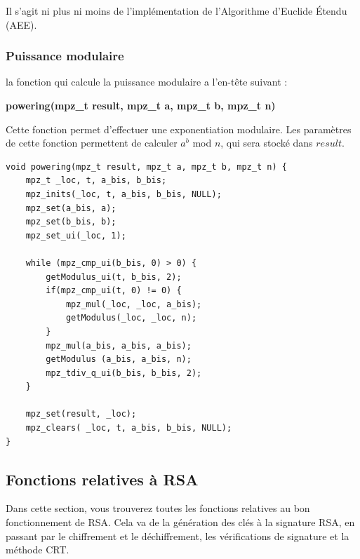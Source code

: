 \documentclass[12pt]{article}
\theoremstyle{definition}\newtheorem{defn}{Définition}
\theoremstyle{definition}\newtheorem{exm}{Exemple}
\theoremstyle{definition}\newtheorem{rem}{Remarque}
\theoremstyle{definition}\newtheorem{algo}{Algorithme}
\theoremstyle{remark}\newtheorem{exo}{Exercice}
\theoremstyle{remark}\newtheorem{nota}{Notation}
\begin{document}
Il s'agit ni plus ni moins de l'implémentation de l'Algorithme d'Euclide Étendu (AEE).


\pagebreak


\subsubsection{Puissance modulaire}

la fonction qui calcule la puissance modulaire a l'en-tête suivant :
\begin{center}
\textbf{powering(mpz\_t result, mpz\_t a, mpz\_t b, mpz\_t n)}
\end{center}
Cette fonction permet d'effectuer une exponentiation modulaire. Les paramètres de cette fonction permettent de calculer $a^b$ mod $n$, qui sera stocké dans $result$. 

\begin{lstlisting}[style=CStyle]
void powering(mpz_t result, mpz_t a, mpz_t b, mpz_t n) {
    mpz_t _loc, t, a_bis, b_bis;
    mpz_inits(_loc, t, a_bis, b_bis, NULL);
    mpz_set(a_bis, a);
    mpz_set(b_bis, b);
    mpz_set_ui(_loc, 1);

    while (mpz_cmp_ui(b_bis, 0) > 0) {
        getModulus_ui(t, b_bis, 2);
        if(mpz_cmp_ui(t, 0) != 0) {
            mpz_mul(_loc, _loc, a_bis);
            getModulus(_loc, _loc, n);
        }
        mpz_mul(a_bis, a_bis, a_bis);
        getModulus (a_bis, a_bis, n);
        mpz_tdiv_q_ui(b_bis, b_bis, 2);
    }

    mpz_set(result, _loc);
    mpz_clears( _loc, t, a_bis, b_bis, NULL);
}
\end{lstlisting}


\pagebreak

\subsection{Fonctions relatives à RSA}

Dans cette section, vous trouverez toutes les fonctions relatives au bon fonctionnement de RSA. Cela va de la génération des clés à la signature RSA, en passant par le chiffrement et le déchiffrement, les vérifications de signature et la méthode CRT.
\end{document}
